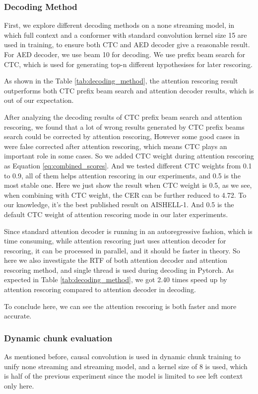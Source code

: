 \documentclass[a4paper]{article}
\begin{document}
\subsubsection{Decoding Method}

First, we explore different decoding methods on a none streaming model, in which full context and a conformer with standard convolution kernel size 15 are used in training, to ensure both CTC and AED decoder give a reasonable result. For AED decoder, we use beam 10 for decoding. We use prefix beam search for CTC, which is used for generating top-n different hypothesises for later rescoring.

As shown in the Table \ref{tab:decoding_method}, the attention rescoring result outperforms both CTC prefix beam search and attention decoder results, which is out of our expectation.

After analyzing the decoding results of CTC prefix beam search and attention rescoring, we found that a lot of wrong results generated by CTC prefix beams search could be corrected by attention rescoring, However some good cases in were false corrected after attention rescoring, which means CTC plays an important role in some cases. So we added CTC weight during attention rescoring as Equation \ref{eq:combined_scores}. And we tested different CTC weights from 0.1 to 0.9, all of them helps attention rescoring in our experiments, and 0.5 is the most stable one. Here we just show the result when CTC weight is 0.5, as we see, when combining with CTC weight, the CER can be further reduced to 4.72.
To our knowledge, it's the best published result on AISHELL-1. And 0.5 is the default CTC weight of attention rescoring mode in our later experiments. 

Since standard attention decoder is running in an autoregressive fashion, which is time consuming, while attention rescoring just uses attention decoder for rescoring, it can be processed in parallel, and it should be faster in theory.
So here we also investigate the RTF of both attention decoder and attention rescoring method, and single thread is used during decoding in Pytorch. As expected in Table \ref{tab:decoding_method}, we got 2.40 times speed up by attention rescoring compared to attention decoder in decoding.

To conclude here, we can see the attention rescoring is both faster and more accurate.

\subsubsection{Dynamic chunk evaluation}
As mentioned before, causal convolution is used in dynamic chunk training to unify none streaming and streaming model, and a kernel size of 8 is used, which is half of the previous experiment since the model is limited to see left context only here.
\end{document}
